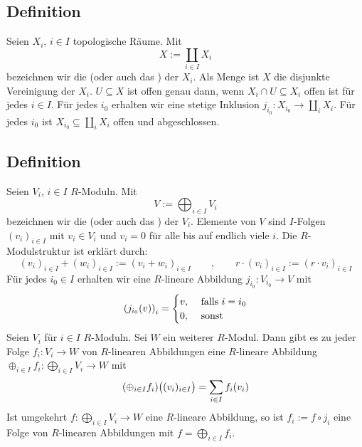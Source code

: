 \subsection[Definition: Summe oder Koprodukt von topologischen Räumen]{Definition} %
\label{sub:68}
Seien $X_i$, $i \in I$ topologische Räume. Mit 
\[
	X := \coprod_{i \in I} X_i 
\]
bezeichnen wir die  (oder auch das ) der $X_i$. Als Menge
ist $X$ die disjunkte Vereinigung der $X_i$. $U \subseteq X$ ist offen genau dann, wenn $X_i \cap U \subseteq X_i$ offen ist für jedes $i \in I$. Für jedes $i_0$ erhalten
wir eine stetige Inklusion $j_{i_0} \colon X_{i_0} \to \coprod_{i} X_i$.
Für jedes $i_0$ ist $X_{i_0} \subseteq \coprod_i X_i$ offen und abgeschlossen.

\subsection[Definition: Summe von $R$-Moduln]{Definition} %
\label{sub:69}
Seien $V_i$, $i \in I$ $R$-Moduln. Mit 
\[
	V := \bigoplus_{i \in I} V_i
\]
bezeichnen wir die  (oder auch das ) der $V_i$. Elemente von $V$ sind $I$-Folgen $(v_i)_{i \in I}$ mit $v_i \in V_i$ und $v_i=0$ für
alle bis auf endlich viele $i$. Die $R$-Modulstruktur ist erklärt durch:
\[
	(v_i)_{i \in I} + (w_i)_{i \in I} := (v_i +w_i)_{i \in I} \qquad ,\qquad r \cdot (v_i)_{i \in I} := (r \cdot v_i)_{i \in I}
\]
Für jedes $i_0 \in I$ erhalten wir eine $R$-lineare Abbildung $j_{i_0} \colon V_{i_0} \to V$ mit
\[
	\enbrace*{j_{i_0} (v)}_{i} = \begin{cases}
		v, &\text{ falls }i=i_0\\
		0 ,&\text{ sonst}
	\end{cases} 
\]
Seien $V_i$ für $i \in I$ $R$-Moduln. Sei $W$ ein weiterer $R$-Modul. Dann gibt es zu jeder Folge $f_i \colon V_i \to W$ von $R$-linearen Abbildungen eine
$R$-lineare Abbildung 
\(
	\oplus_{i \in I} f_i \colon \bigoplus_{i \in I} V_i \to W  
\)
mit
\[
	\enbrace*{\oplus_{i \in I} f_i} \enbrace[\big]{(v_i)_{i \in I}} = \sum_{i \in I} f_i(v_i)  
\]
Ist umgekehrt $f \colon \bigoplus_{i \in I} V_i \to W$ eine $R$-lineare Abbildung, so ist $f_i := f \circ j_{i}$ eine Folge von $R$-linearen Abbildungen mit 
$f = \bigoplus_{i \in I} f_i$.

